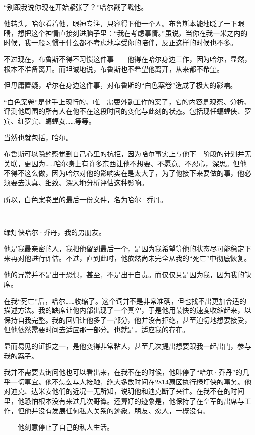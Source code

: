 \documentclass[../main]{subfiles}
\begin{document}
~\

“别跟我说你现在开始紧张了？”哈尔戳了戳他。

他转头，哈尔看着他，眼神专注，只容得下他一个人。布鲁斯本能地眨了一下眼睛，想把这个神情直接刻进脑子里：“我在考虑事情。”虽说，当你在我一米之内的时候，我一般习惯于什么都不考虑地享受你的陪伴，反正这样的时候也不多。

不过现在，布鲁斯不得不习惯这件事——他得在哈尔身边工作，因为哈尔，显然，根本不准备离开。而坦诚地说，布鲁斯也不希望他离开，从来都不希望。

但毋庸置疑，哈尔在身边这件事，对布鲁斯的“白色案卷”造成了极大的影响。

“白色案卷”是他手上现行的、唯一需要外勤工作的案子，它的内容是观察、分析、评测他周围的所有人在他不在这段时间的变化与此刻的状态。包括现任蝙蝠侠、罗宾、红罗宾、蝙蝠女……等等。

当然也就包括，哈尔。

布鲁斯可以隐约察觉到自己心里的抗拒，因为哈尔事实上与他下一阶段的计划并无关联，更因为……哈尔身上有许多东西让他不想要、不愿意、不忍心，深思。但他不得不这么做，因为哈尔对他的影响实在是太大了，为了他接下来要做的事，他必须要去认真、细致、深入地分析评估这种影响。

所以，白色案卷里的最后一份文件，名为哈尔·乔丹。

~\

绿灯侠哈尔·乔丹，我的男朋友。

他是我最亲密的人，我把他留到最后一个，是因为我希望等他的状态尽可能稳定下来再对他进行评估。不过，直到此时，他依然尚未完全从我的“死亡”中彻底恢复。

他的异常并不是出于恐惧，甚至，不是出于自责。而仅仅只是因为我，因为我的缺席。

在我“死亡”后，哈尔……收缩了。这个词并不是非常准确，但也找不出更加合适的描述方法。我的缺席让他内部出现了一个真空，于是他用最快的速度收缩起来，以保持自我完整。我的回归让他多了一部分，他并没有拒绝，甚至迫切地想要接受，但他依然需要时间去适应那一部分。也就是，适应我的存在。

显而易见的证据之一，是他变得非常粘人，甚至几次提出想要跟我一起出门，参与我的案子。

我并不需要去询问他也可以看出来，在我不在的时候，他叫停了“哈尔·乔丹”的几乎一切事宜。他不怎么与人接触，绝大多数时间在2814扇区执行绿灯侠的事务。他对迪克、达米安他们的近况一无所知，说明他和迪克断了来往。在我不在的时间里，他恐怕根本没有来过几次哥谭。还算好的迹象是，他保持了在空军的出席与工作，但他并没有发展任何私人关系的迹象。朋友、恋人，一概没有。

——他刻意停止了自己的私人生活。
\end{document}
